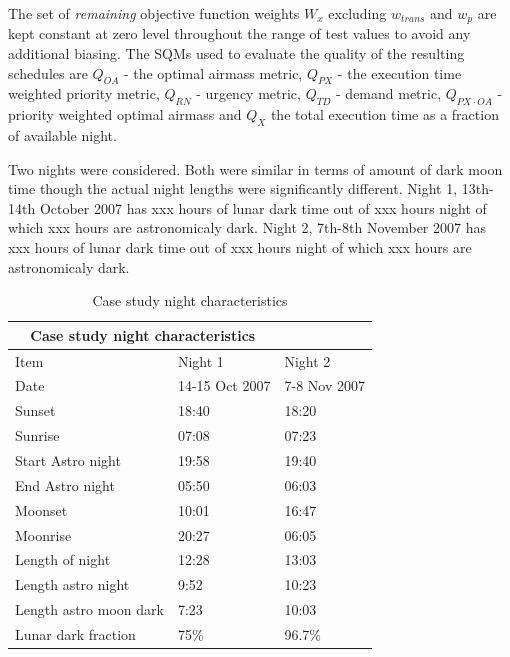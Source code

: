  The set of \emph{remaining} objective function weights ${W_x}$ excluding $w_{trans}$ and $w_p$ are kept constant at zero level throughout the range of test values to avoid any additional biasing. The SQMs used to evaluate the quality of the resulting schedules are $Q_{OA}$ - the optimal airmass metric, $Q_{PX}$ - the execution time weighted priority metric, $Q_{RN}$ - urgency metric, $Q_{TD}$ - demand metric, $Q_{PX \cdot OA}$ - priority weighted optimal airmass and $Q_X$ the total execution time as a fraction of available night. 

Two nights were considered. Both were similar in terms of amount of dark moon time though the actual night lengths were significantly different. Night 1, 13th-14th October 2007 has xxx hours of lunar dark time out of xxx hours night of which xxx hours are astronomicaly dark. Night 2, 7th-8th November 2007 has xxx hours of lunar dark time out of xxx hours night of which xxx hours are astronomicaly dark.


\begin{table}
\begin{center}
\caption{Case study night characteristics}
\begin{tabular}{lll}
\toprule
\multicolumn{2}{c}{Case study night characteristics} \\
\midrule
Item & Night 1 & Night 2 \\
\midrule
Date                & 14-15 Oct 2007 & 7-8 Nov 2007\\
Sunset              & 18:40          & 18:20\\
Sunrise             & 07:08          & 07:23\\
Start Astro night   & 19:58          & 19:40\\
End Astro night     & 05:50          & 06:03\\
Moonset             & 10:01          & 16:47\\
Moonrise            & 20:27          & 06:05\\
\midrule
Length of night     & 12:28          & 13:03\\
Length astro night  & 9:52           & 10:23\\
Length astro moon dark    & 7:23     & 10:03\\
Lunar dark fraction & 75\%           & 96.7\%\\
\bottomrule
\end{tabular}
\end{center}
\end{table}

